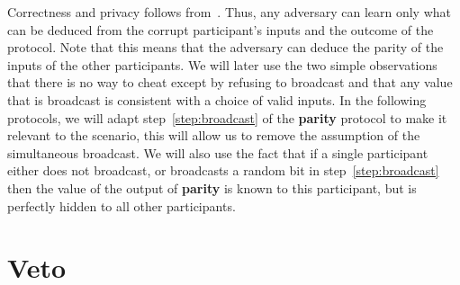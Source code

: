 \documentclass[11pt]{article}
\begin{document}
Correctness and privacy follows from~\cite{Chaum88}. Thus, any
adversary can learn only what can be deduced from the corrupt
participant's inputs and the outcome of the protocol. Note that this
means that the adversary can  deduce the parity of the inputs of the
other participants. We will later use the two simple observations
that there is no way to cheat except by refusing to broadcast and
that any value that is broadcast is consistent with a choice of
valid inputs. In the following protocols, we will adapt
step~\ref{step:broadcast} of the \textbf{parity} protocol  to make
it relevant to the scenario, this will allow us to remove the
assumption of the simultaneous broadcast. We will also use the fact
that if a single participant either does not broadcast, or
broadcasts a random bit in step~\ref{step:broadcast} then the value
of the output of \textbf{parity} is known to this participant, but
is perfectly hidden to all other participants.


\section{Veto}
\label{sec:veto}
\end{document}
